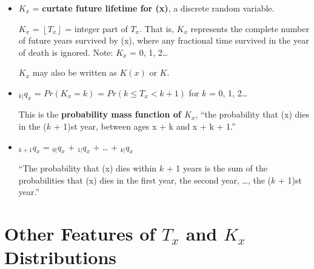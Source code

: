 \documentclass[]{book}
\begin{document}
\begin{itemize}
\item
  \(K_x\) = \textbf{curtate future lifetime for (x)}, a discrete random
  variable.

  \(K_x\) = \(\left\lfloor{T_x}\right\rfloor\) = integer part of
  \(T_x\). That is, \(K_x\) represents the complete number of future
  years survived by (x), where any fractional time survived in the year
  of death is ignored. Note: \(K_x\) = 0, 1, 2\ldots{}

  \(K_x\) may also be written as \(K(x)\) or \(K\).
\item
  \({}_{k|}q_{x}\) = \(Pr(K_x = k)\) = \(Pr(k \le T_x < k + 1)\) for
  \(k\) = 0, 1, 2\ldots{}

  This is the \textbf{probability mass function of \(K_x\)}, ``the
  probability that (x) dies in the (\(k\) + 1)st year, between ages x +
  k and x + k + 1.''
\item
  \({}_{k+1}q_{x}\) = \({}_{0|}q_{x}\) + \({}_{1|}q_{x}\) + \ldots{} +
  \({}_{k|}q_{x}\)

  ``The probability that (x) dies within \(k\) + 1 years is the sum of
  the probabilities that (x) dies in the first year, the second year,
  \ldots{}, the (\(k\) + 1)st year.''
\end{itemize}

\section{\texorpdfstring{Other Features of \(T_x\) and \(K_x\)
Distributions}{Other Features of T\_x and K\_x Distributions}}\label{other-features-of-t_x-and-k_x-distributions}
\end{document}
